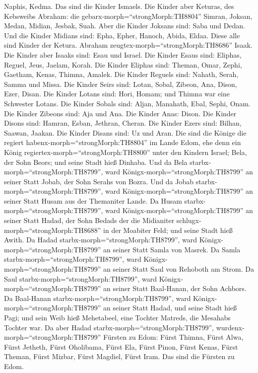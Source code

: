 Naphis, Kedma. Das sind die Kinder Ismaels.  Die Kinder
aber Keturas, des Kebsweibs Abraham: die
gebarx-morph=``strongMorph:TH8804'' Simran, Joksan, Medan, Midian,
Jesbak, Suah. Aber die Kinder Joksans sind: Saba und Dedan.
 Und die Kinder Midians sind: Epha, Epher, Hanoch, Abida,
Eldaa. Diese alle sind Kinder der Ketura.  Abraham
zeugtex-morph=``strongMorph:TH8686'' Isaak. Die Kinder aber Isaaks sind:
Esau und Israel.  Die Kinder Esaus sind: Eliphas, Reguel,
Jeus, Jaelam, Korah.  Die Kinder Eliphas sind: Theman,
Omar, Zephi, Gaetham, Kenas, Thimna, Amalek.  Die Kinder
Reguels sind: Nahath, Serah, Samma und Missa.  Die Kinder
Seirs sind: Lotan, Sobal, Zibeon, Ana, Dison, Ezer, Disan. 
Die Kinder Lotans sind: Hori, Homam; und Thimna war eine Schwester
Lotans.  Die Kinder Sobals sind: Aljan, Manahath, Ebal,
Sephi, Onam. Die Kinder Zibeons sind: Aja und Ana.  Die
Kinder Anas: Dison. Die Kinder Disons sind: Hamran, Esban, Jethran,
Cheran.  Die Kinder Ezers sind: Bilhan, Saawan, Jaakan. Die
Kinder Disans sind: Uz und Aran.  Die sind die Könige die
regiert habenx-morph=``strongMorph:TH8804'' im Lande Edom, ehe denn ein
König regiertex-morph=``strongMorph:TH8800'' unter den Kindern Israel;
Bela, der Sohn Beors; und seine Stadt hieß Dinhaba.  Und da
Bela starbx-morph=``strongMorph:TH8799'', ward
Königx-morph=``strongMorph:TH8799'' an seiner Statt Jobab, der Sohn
Serahs von Bozra.  Und da Jobab
starbx-morph=``strongMorph:TH8799'', ward
Königx-morph=``strongMorph:TH8799'' an seiner Statt Husam aus der
Themaniter Lande.  Da Husam
starbx-morph=``strongMorph:TH8799'', ward
Königx-morph=``strongMorph:TH8799'' an seiner Statt Hadad, der Sohn
Bedads der die Midianiter schlugx-morph=``strongMorph:TH8688'' in der
Moabiter Feld; und seine Stadt hieß Awith.  Da Hadad
starbx-morph=``strongMorph:TH8799'', ward
Königx-morph=``strongMorph:TH8799'' an seiner Statt Samla von Masrek.
 Da Samla starbx-morph=``strongMorph:TH8799'', ward
Königx-morph=``strongMorph:TH8799'' an seiner Statt Saul von Rehoboth am
Strom.  Da Saul starbx-morph=``strongMorph:TH8799'', ward
Königx-morph=``strongMorph:TH8799'' an seiner Statt Baal-Hanan, der Sohn
Achbors.  Da Baal-Hanan
starbx-morph=``strongMorph:TH8799'', ward
Königx-morph=``strongMorph:TH8799'' an seiner Statt Hadad, und seine
Stadt hieß Pagi; und sein Weib hieß Mehetabeel, eine Tochter Matreds,
die Mesahabs Tochter war.  Da aber Hadad
starbx-morph=``strongMorph:TH8799'',
wurdenx-morph=``strongMorph:TH8799'' Fürsten zu Edom: Fürst Thimna,
Fürst Alwa, Fürst Jetheth,  Fürst Oholibama, Fürst Ela,
Fürst Pinon,  Fürst Kenas, Fürst Theman, Fürst Mizbar,
 Fürst Magdiel, Fürst Iram. Das sind die Fürsten zu Edom.

